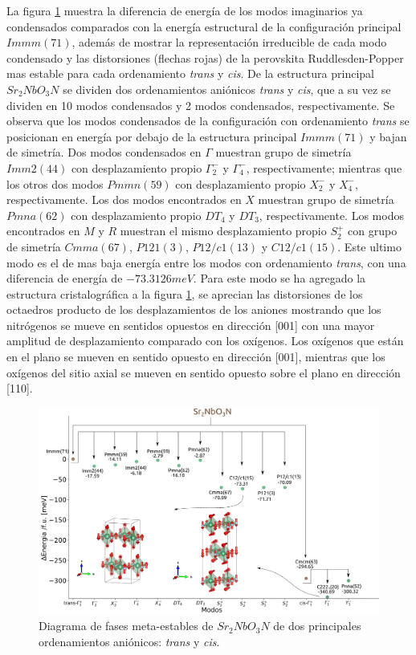 La figura \ref{Nb-irreps} muestra la diferencia de energía de los modos imaginarios ya condensados comparados con la energía estructural de la configuración principal $Immm(71)$, además de mostrar la representación irreducible de cada modo condensado y las distorsiones (flechas rojas) de la perovskita Ruddlesden-Popper mas estable para cada ordenamiento \emph{trans} y \emph{cis}. De la estructura principal $Sr_{2}NbO_{3}N$ se dividen dos ordenamientos aniónicos \emph{trans} y \emph{cis}, que a su vez se dividen en 10 modos condensados y 2 modos condensados, respectivamente. Se observa que los modos condensados de la configuración con ordenamiento \emph{trans} se posicionan en energía por debajo de la estructura principal $Immm(71)$ y bajan de simetría. Dos modos condensados en $\Gamma$ muestran grupo de simetría $Imm2(44)$ con desplazamiento propio $\Gamma_{2}^{-}$ y $\Gamma_{4}^{-}$, respectivamente; mientras que los otros dos modos $Pmmn(59)$ con desplazamiento propio $X_{2}^{-}$ y $X_{4}^{-}$, respectivamente. Los dos modos encontrados en $X$ muestran grupo de simetría $Pmna(62)$ con desplazamiento propio $DT_{4}$ y $DT_{3}$, respectivamente. Los modos encontrados en $M$ y $R$ muestran el mismo desplazamiento propio $S_{2}^{+}$ con grupo de simetría $Cmma(67)$, $P121(3)$, $P12/c1(13)$ y $C12/c1(15)$. Este ultimo modo es el de mas baja energía entre los modos con ordenamiento \emph{trans}, con una diferencia de energía de $-73.3126meV$. Para este modo se ha agregado la estructura cristalográfica a la figura \ref{Nb-irreps}, se aprecian las distorsiones de los octaedros producto de los desplazamientos de los aniones mostrando que los nitrógenos se mueve en sentidos opuestos en dirección [001] con una mayor amplitud de desplazamiento comparado con los oxígenos. Los oxígenos que están en el plano se mueven en sentido opuesto en dirección [001], mientras que los oxígenos del sitio axial se mueven en sentido opuesto sobre el plano en dirección [110].

\begin{figure}[H]
    \centering
    \includegraphics[width=\textwidth]{Figs/Nb-irreps.png}
    \caption{Diagrama de fases meta-estables de $Sr_{2}NbO_{3}N$ de dos principales ordenamientos aniónicos: \emph{trans} y \emph{cis}.}
    \label{Nb-irreps}
\end{figure}

